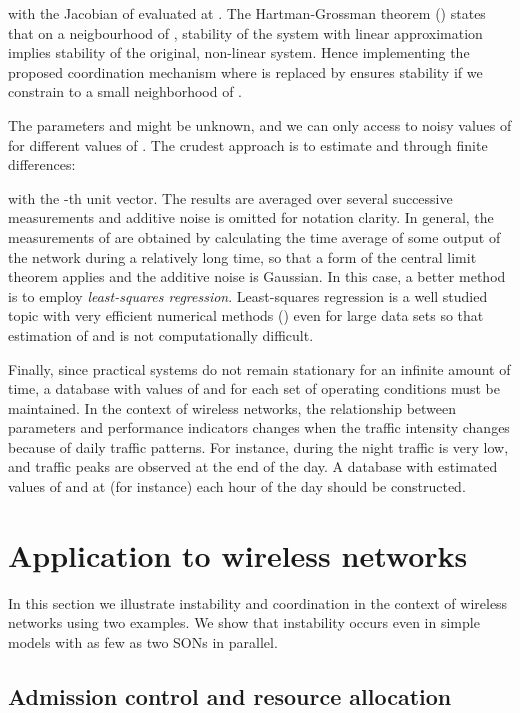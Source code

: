 \documentclass[10pt,conference,letterpaper]{IEEEtran}
\begin{document}
with  the Jacobian of  evaluated at . The Hartman-Grossman theorem (\cite{HartmanGrossman}) states that on a neigbourhood of , stability of the system with linear approximation implies stability of the original, non-linear system. Hence implementing the proposed coordination mechanism where  is replaced by  ensures stability if we constrain  to a small neighborhood of .
	
	The parameters  and  might be unknown, and we can only access to noisy values of  for different values of . The crudest approach is to estimate  and  through finite differences:
	
	with  the -th unit vector. The results are averaged over several successive measurements and additive noise is omitted for notation clarity. In general, the measurements of  are obtained by calculating the time average of some output of the network during a relatively long time, so that a form of the central limit theorem applies and the additive noise is Gaussian. In this case, a better method is to employ \emph{least-squares regression}. Least-squares regression is a well studied topic  with very efficient numerical methods (\cite{LeastSquaresBjorck}) even for large data sets so that estimation of  and  is not computationally difficult.
	
	Finally, since practical systems do not remain stationary for an infinite amount of time, a database with values of  and  for each set of operating conditions must be maintained. In the context of wireless networks, the relationship between parameters and performance indicators changes when the traffic intensity changes because of daily traffic patterns. For instance, during the night traffic is very low, and traffic peaks are observed at the end of the day. A database with estimated values of  and  at (for instance) each hour of the day should be constructed. 
	
\section{Application to wireless networks}\label{sec:application}
	In this section we illustrate instability and coordination in the context of wireless networks using two examples. We show that instability occurs even in simple models with as few as two \acp{SON} in parallel.
\subsection{Admission control and resource allocation}
\end{document}
